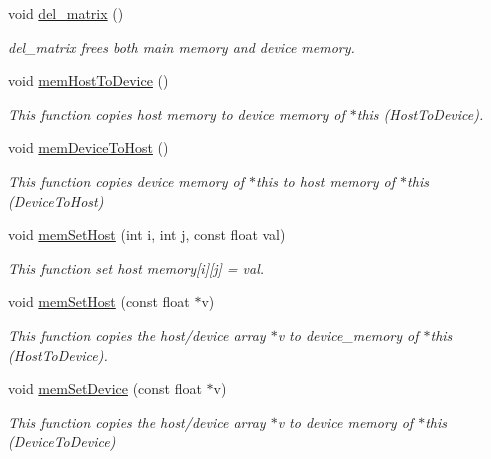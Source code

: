 \begin{DoxyCompactItemize}
void \mbox{\hyperlink{classcuMat_a76fc37b5688d34d9c5b4f55957b8d8ab}{del\+\_\+matrix}} ()
\begin{DoxyCompactList}\small\item\em del\+\_\+matrix frees both main memory and device memory. \end{DoxyCompactList}\item 
\mbox{\label{classcuMat_ac691515ea837e23fa59e4588ff5e785f}} 
void \mbox{\hyperlink{classcuMat_ac691515ea837e23fa59e4588ff5e785f}{mem\+Host\+To\+Device}} ()
\begin{DoxyCompactList}\small\item\em This function copies host memory to device memory of $\ast$this (Host\+To\+Device). \end{DoxyCompactList}\item 
void \mbox{\hyperlink{classcuMat_ac17e2c321db8ee5c30dc18a470f72a7b}{mem\+Device\+To\+Host}} ()
\begin{DoxyCompactList}\small\item\em This function copies device memory of $\ast$this to host memory of $\ast$this (Device\+To\+Host) \end{DoxyCompactList}\item 
\mbox{\label{classcuMat_a549728c7eac063f6ea2cc2667d827b58}} 
void \mbox{\hyperlink{classcuMat_a549728c7eac063f6ea2cc2667d827b58}{mem\+Set\+Host}} (int i, int j, const float val)
\begin{DoxyCompactList}\small\item\em This function set host memory\mbox{[}i\mbox{]}\mbox{[}j\mbox{]} = val. \end{DoxyCompactList}\item 
\mbox{\label{classcuMat_aa11b125d69c657dc3c2ab7badc98f589}} 
void \mbox{\hyperlink{classcuMat_aa11b125d69c657dc3c2ab7badc98f589}{mem\+Set\+Host}} (const float $\ast$v)
\begin{DoxyCompactList}\small\item\em This function copies the host/device array $\ast$v to device\+\_\+memory of $\ast$this (Host\+To\+Device). \end{DoxyCompactList}\item 
void \mbox{\hyperlink{classcuMat_a2a5738cd5f2b52cc3c2c61ae23d564a9}{mem\+Set\+Device}} (const float $\ast$v)
\begin{DoxyCompactList}\small\item\em This function copies the host/device array $\ast$v to device memory of $\ast$this (Device\+To\+Device) \end{DoxyCompactList}\item 

\end{DoxyCompactItemize}
